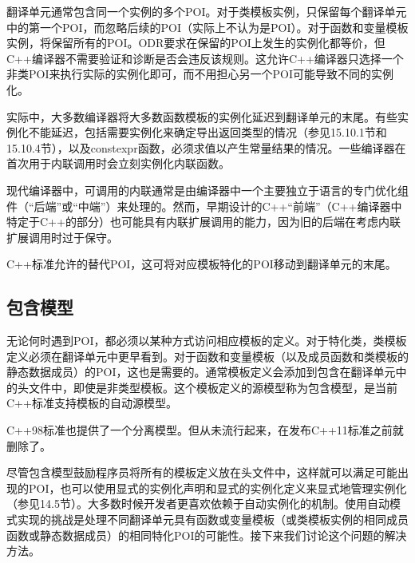 翻译单元通常包含同一个实例的多个POI。对于类模板实例，只保留每个翻译单元中的第一个POI，而忽略后续的POI（实际上不认为是POI）。对于函数和变量模板实例，将保留所有的POI。ODR要求在保留的POI上发生的实例化都等价，但C++编译器不需要验证和诊断是否会违反该规则。这允许C++编译器只选择一个非类POI来执行实际的实例化即可，而不用担心另一个POI可能导致不同的实例化。

实际中，大多数编译器将大多数函数模板的实例化延迟到翻译单元的末尾。有些实例化不能延迟，包括需要实例化来确定导出返回类型的情况（参见15.10.1节和15.10.4节），以及constexpr函数，必须求值以产生常量结果的情况。一些编译器在首次用于内联调用时会立刻实例化内联函数。

\begin{notice}
现代编译器中，可调用的内联通常是由编译器中一个主要独立于语言的专门优化组件（“后端”或“中端”）来处理的。然而，早期设计的C++“前端”（C++编译器中特定于C++的部分）也可能具有内联扩展调用的能力，因为旧的后端在考虑内联扩展调用时过于保守。
\end{notice}

C++标准允许的替代POI，这可将对应模板特化的POI移动到翻译单元的末尾。

\subsection{包含模型}

无论何时遇到POI，都必须以某种方式访问相应模板的定义。对于特化类，类模板定义必须在翻译单元中更早看到。对于函数和变量模板（以及成员函数和类模板的静态数据成员）的POI，这也是需要的。通常模板定义会添加到包含在翻译单元中的头文件中，即使是非类型模板。这个模板定义的源模型称为包含模型，是当前C++标准支持模板的自动源模型。

\begin{notice}
C++98标准也提供了一个分离模型。但从未流行起来，在发布C++11标准之前就删除了。
\end{notice}

尽管包含模型鼓励程序员将所有的模板定义放在头文件中，这样就可以满足可能出现的POI，也可以使用显式的实例化声明和显式的实例化定义来显式地管理实例化（参见14.5节）。大多数时候开发者更喜欢依赖于自动实例化的机制。使用自动模式实现的挑战是处理不同翻译单元具有函数或变量模板（或类模板实例的相同成员函数或静态数据成员）的相同特化POI的可能性。接下来我们讨论这个问题的解决方法。







